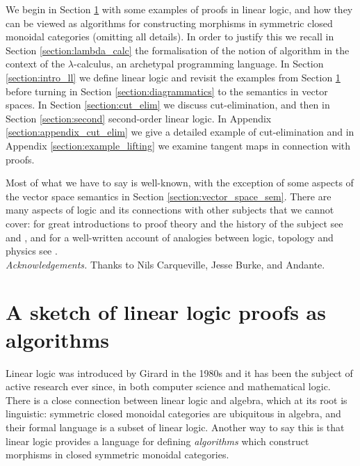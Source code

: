 \documentclass[english,letter paper,12pt,reqno]{article}
\theoremstyle{example}
\begin{document}
We begin in Section \ref{section:sketch} with some examples of proofs in linear logic, and how they can be viewed as algorithms for constructing morphisms in symmetric closed monoidal categories (omitting all details). In order to justify this we recall in Section \ref{section:lambda_calc} the formalisation of the notion of algorithm in the context of the $\lambda$-calculus, an archetypal programming language. In Section \ref{section:intro_ll} we define linear logic and revisit the examples from Section \ref{section:sketch} before turning in Section \ref{section:diagrammatics} to the semantics in vector spaces. In Section \ref{section:cut_elim} we discuss cut-elimination, and then in Section \ref{section:second} second-order linear logic. In Appendix \ref{section:appendix_cut_elim} we give a detailed example of cut-elimination and in Appendix \ref{section:example_lifting} we examine tangent maps in connection with proofs.

Most of what we have to say is well-known, with the exception of some aspects of the vector space semantics in Section \ref{section:vector_space_sem}. There are many aspects of logic and its connections with other subjects that we cannot cover: for great introductions to proof theory and the history of the subject see \cite[Chapter 1]{girard_prooftypes} and \cite[\S 1]{mellies}, and for a well-written account of analogies between logic, topology and physics see \cite{baez}.
\\

\emph{Acknowledgements.} Thanks to Nils Carqueville, Jesse Burke, and Andante.
\\

\section{A sketch of linear logic proofs as algorithms}\label{section:sketch}

Linear logic was introduced by Girard in the 1980s \cite{girard_llogic} and it has been the subject of active research ever since, in both computer science and mathematical logic. There is a close connection between linear logic and algebra, which at its root is linguistic: symmetric closed monoidal categories are ubiquitous in algebra, and their formal language is a subset of linear logic. Another way to say this is that linear logic provides a language for defining \emph{algorithms} which construct morphisms in closed symmetric monoidal categories.
\end{document}

